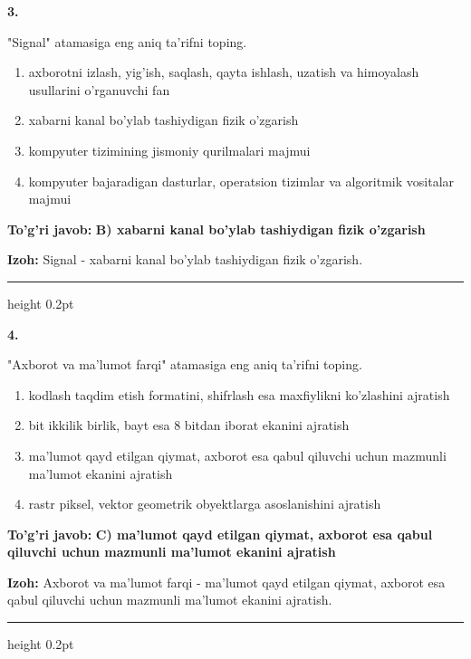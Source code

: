 \documentclass[10pt,a4paper,oneside]{article}
\begin{document}
\noindent\textbf{\color{ink}3.}
\par
"Signal" atamasiga eng aniq ta'rifni toping.
\begin{enumerate}[label=\Alph*),leftmargin=9mm]
\item axborotni izlash, yig'ish, saqlash, qayta ishlash, uzatish va himoyalash usullarini o'rganuvchi fan
\item xabarni kanal bo'ylab tashiydigan fizik o'zgarish
\item kompyuter tizimining jismoniy qurilmalari majmui
\item kompyuter bajaradigan dasturlar, operatsion tizimlar va algoritmik vositalar majmui
\end{enumerate}
\begin{tcolorbox}[enhanced,breakable,colback=teal!4,colframe=teal!50!black,boxrule=0.5pt,arc=1.1mm,left=3mm,right=3mm,top=1.7mm,bottom=1.7mm,before skip=2mm,after skip=2mm]
\textbf{\color{teal}To'g'ri javob:} \textbf{B) xabarni kanal bo'ylab tashiydigan fizik o'zgarish}
\par\smallskip
\textbf{Izoh:} Signal - xabarni kanal bo'ylab tashiydigan fizik o'zgarish.
\end{tcolorbox}
\vspace{2mm}\hrule height 0.2pt \vspace{3mm}

\noindent\textbf{\color{ink}4.}
\par
"Axborot va ma'lumot farqi" atamasiga eng aniq ta'rifni toping.
\begin{enumerate}[label=\Alph*),leftmargin=9mm]
\item kodlash taqdim etish formatini, shifrlash esa maxfiylikni ko'zlashini ajratish
\item bit ikkilik birlik, bayt esa 8 bitdan iborat ekanini ajratish
\item ma'lumot qayd etilgan qiymat, axborot esa qabul qiluvchi uchun mazmunli ma'lumot ekanini ajratish
\item rastr piksel, vektor geometrik obyektlarga asoslanishini ajratish
\end{enumerate}
\begin{tcolorbox}[enhanced,breakable,colback=teal!4,colframe=teal!50!black,boxrule=0.5pt,arc=1.1mm,left=3mm,right=3mm,top=1.7mm,bottom=1.7mm,before skip=2mm,after skip=2mm]
\textbf{\color{teal}To'g'ri javob:} \textbf{C) ma'lumot qayd etilgan qiymat, axborot esa qabul qiluvchi uchun mazmunli ma'lumot ekanini ajratish}
\par\smallskip
\textbf{Izoh:} Axborot va ma'lumot farqi - ma'lumot qayd etilgan qiymat, axborot esa qabul qiluvchi uchun mazmunli ma'lumot ekanini ajratish.
\end{tcolorbox}
\vspace{2mm}\hrule height 0.2pt \vspace{3mm}
\end{document}
